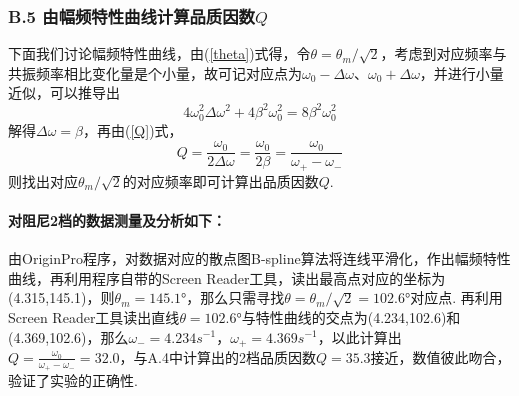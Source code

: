 \documentclass[UTF8]{ctexart}
\begin{document}
\subsubsection*{B.5 由幅频特性曲线计算品质因数$Q$}
下面我们讨论幅频特性曲线，由(\ref{theta})式得，令$\theta=\theta_m/\sqrt2$，考虑到对应频率与共振频率相比变化量是个小量，故可记对应点为$\omega_0-\Delta\omega$、$\omega_0+\Delta\omega$，并进行小量近似，可以推导出
\begin{equation}
4\omega_0^2\Delta\omega^2+4\beta^2\omega_0^2=8\beta^2\omega_0^2
\end{equation}
解得$\Delta\omega=\beta$，再由(\ref{Q})式，
\begin{equation}\label{Q2}
Q=\frac{\omega_0}{2\Delta\omega}=\frac{\omega_0}{2\beta}=\frac{\omega_0}{\omega_{+}-\omega_{-}}
\end{equation}
则找出对应$\theta_m/\sqrt2$的对应频率即可计算出品质因数$Q$.

\paragraph{对阻尼2档的数据测量及分析如下：}\quad \par

\begin{figure}[H]\end{figure}

由OriginPro程序，对数据对应的散点图B-spline算法将连线平滑化，作出幅频特性曲线，再利用程序自带的Screen Reader工具，读出最高点对应的坐标为(4.315,145.1)，则$\theta_m=145.1$°，那么只需寻找$\theta=\theta_m/\sqrt2=102.6$°对应点. 再利用Screen Reader工具读出直线$\theta=102.6$°与特性曲线的交点为(4.234,102.6)和(4.369,102.6)，那么$\omega_{-}=4.234s^{-1}$，$\omega_{+}=4.369s^{-1}$，以此计算出$\displaystyle{Q=\frac{\omega_0}{\omega_{+}-\omega_{-}}=32.0}$，与A.4中计算出的2档品质因数$Q=35.3$接近，数值彼此吻合，验证了实验的正确性.
\end{document}
